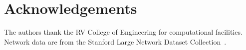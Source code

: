 \documentclass[review,12pt]{elsarticle}
\begin{document}
\section*{Acknowledgements}

The authors thank the RV College of Engineering for computational facilities.
Network data are from the Stanford Large Network Dataset
Collection~\cite{snapnets}.



\end{document}
